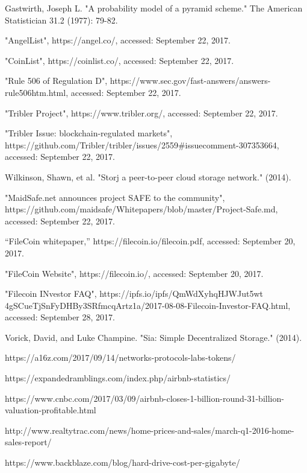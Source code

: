 \documentclass[conference]{IEEEtran}
\begin{document}
\begin{thebibliography}{1}
 Gastwirth, Joseph L. "A probability model of a pyramid scheme." The American Statistician 31.2 (1977): 79-82.

 "AngelList", https://angel.co/, accessed: September 22, 2017.

 "CoinList", https://coinlist.co/, accessed: September 22, 2017.

 "Rule 506 of Regulation D", https://www.sec.gov/fast-answers/answers-rule506htm.html, accessed: September 22, 2017.

 "Tribler Project", https://www.tribler.org/, accessed: September 22, 2017.

"Tribler Issue: blockchain-regulated markets", https://github.com/Tribler/tribler/issues/2559\#issuecomment-307353664, accessed: September 22, 2017.

 Wilkinson, Shawn, et al. "Storj a peer-to-peer cloud storage network." (2014).

 "MaidSafe.net announces project SAFE to the community", https://github.com/maidsafe/Whitepapers/blob/master/Project-Safe.md, accessed: September 22, 2017.

 “FileCoin
whitepaper,” https://filecoin.io/filecoin.pdf, accessed: September 20, 2017.

 "FileCoin Website", https://filecoin.io/, accessed: September 20, 2017.

 "Filecoin INvestor FAQ", https://ipfs.io/ipfs/QmWdXyhqHJWJut5wt\\4gSCueTjSnFyDHBy3SRfmcqArtz1a/2017-08-08-Filecoin-Investor-FAQ.html, accessed: September 28, 2017.

 Vorick, David, and Luke Champine. "Sia: Simple Decentralized Storage." (2014).

 https://a16z.com/2017/09/14/networks-protocols-labs-tokens/

 https://expandedramblings.com/index.php/airbnb-statistics/

 https://www.cnbc.com/2017/03/09/airbnb-closes-1-billion-round-31-billion-valuation-profitable.html

 http://www.realtytrac.com/news/home-prices-and-sales/march-q1-2016-home-sales-report/

 https://www.backblaze.com/blog/hard-drive-cost-per-gigabyte/


\end{thebibliography}
\end{document}
